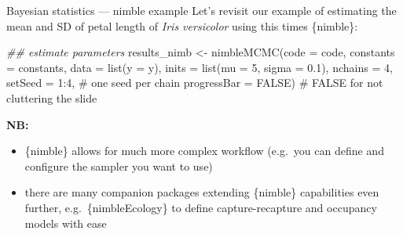 \documentclass[
  ignorenonframetext,
  aspectratio=169,
  t]{beamer}
\newenvironment{Shaded}{\begin{snugshade}}{\end{snugshade}}
\newcommand{\AttributeTok}[1]{\textcolor[rgb]{0.40,0.45,0.13}{#1}}
\newcommand{\CommentTok}[1]{\textcolor[rgb]{0.37,0.37,0.37}{#1}}
\newcommand{\ConstantTok}[1]{\textcolor[rgb]{0.56,0.35,0.01}{#1}}
\newcommand{\DecValTok}[1]{\textcolor[rgb]{0.68,0.00,0.00}{#1}}
\newcommand{\DocumentationTok}[1]{\textcolor[rgb]{0.37,0.37,0.37}{\textit{#1}}}
\newcommand{\FloatTok}[1]{\textcolor[rgb]{0.68,0.00,0.00}{#1}}
\newcommand{\FunctionTok}[1]{\textcolor[rgb]{0.28,0.35,0.67}{#1}}
\newcommand{\NormalTok}[1]{\textcolor[rgb]{0.00,0.23,0.31}{#1}}
\newcommand{\OtherTok}[1]{\textcolor[rgb]{0.00,0.23,0.31}{#1}}
\newcommand{\SpecialCharTok}[1]{\textcolor[rgb]{0.37,0.37,0.37}{#1}}
\providecommand{\tightlist}{%
  \setlength{\itemsep}{0pt}\setlength{\parskip}{0pt}}
\begin{document}
\begin{frame}[fragile]{Bayesian statistics --- nimble example}
\protect{}\label{bayesian-statistics-nimble-example-1}
Let's revisit our example of estimating the mean and SD of petal length
of \emph{Iris versicolor} using this times \{nimble\}:

\footnotesize

\begin{Shaded}
\begin{Highlighting}[]
\DocumentationTok{\#\# estimate parameters}
\NormalTok{results\_nimb }\OtherTok{\textless{}{-}} \FunctionTok{nimbleMCMC}\NormalTok{(}\AttributeTok{code =}\NormalTok{ code,}
                           \AttributeTok{constants =}\NormalTok{ constants,}
                           \AttributeTok{data =} \FunctionTok{list}\NormalTok{(}\AttributeTok{y =}\NormalTok{ y),}
                           \AttributeTok{inits =} \FunctionTok{list}\NormalTok{(}\AttributeTok{mu =} \DecValTok{5}\NormalTok{, }\AttributeTok{sigma =} \FloatTok{0.1}\NormalTok{),}
                           \AttributeTok{nchains =} \DecValTok{4}\NormalTok{,}
                           \AttributeTok{setSeed =} \DecValTok{1}\SpecialCharTok{:}\DecValTok{4}\NormalTok{, }\CommentTok{\# one seed per chain}
                           \AttributeTok{progressBar =} \ConstantTok{FALSE}\NormalTok{) }\CommentTok{\# FALSE for not cluttering the slide}
\end{Highlighting}
\end{Shaded}

\normalsize

\textbf{NB:}

\begin{itemize}
\tightlist
\item
  \{nimble\} allows for much more complex workflow (e.g.~you can define
  and configure the sampler you want to use)
\item
  there are many companion packages extending \{nimble\} capabilities
  even further, e.g.~\{nimbleEcology\} to define capture-recapture and
  occupancy models with ease
\end{itemize}
\end{frame}
\end{document}
